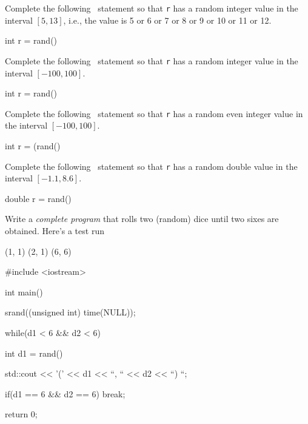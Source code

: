 

\nextq
Complete the following \cpp\ statement so that \verb!r! has a random integer
value in the interval $[5, 13]$,
i.e., the value is 5 or 6 or 7 or 8 or 9 or 10 or 11 or 12.
\\
\ANSWER
\begin{answercode}
int r = rand() %
\end{answercode}

\nextq
Complete the following \cpp\ statement so that \verb!r! has a random integer value
in the interval $[-100, 100]$.
\\
\ANSWER
\begin{answercode}
int r = rand() %
\end{answercode}

\nextq
Complete the following \cpp\ statement
so that \verb!r! has a random even integer value
in the interval $[-100, 100]$.
\\
\ANSWER
\begin{answercode}
int r = (rand() %
\end{answercode}

\nextq
Complete the following \cpp\ statement so that \verb!r! has a random double value
in the interval $[-1.1, 8.6]$.
\\
\ANSWER
\begin{answercode}
double r = rand() %
\end{answercode}

\nextq
Write a \textit{complete program} that rolls two (random) dice until two
sixes are obtained.
Here's a test run
\begin{console}[fontsize=\footnotesize]
(1, 1) (2, 1) (6, 6)
\end{console}
\ANSWER
\begin{answercode}
#include <iostream>

int main()
{
  srand((unsigned int) time(NULL));

  while(d1 < 6 && d2 < 6)
  {
    int d1 = rand() %

    std::cout << '(' << d1 << ``, `` << d2 << ``) ``;
    
    if(d1 == 6 && d2 == 6)
    {
      break;
    }
  }
  return 0;
}
\end{answercode}


